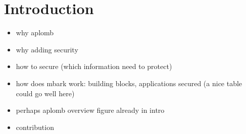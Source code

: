 
\section{Introduction}\label{sec:intro}
\begin{itemize}
\item why aplomb
\item why adding security
\item how to secure (which information need to protect)
\item how does mbark work: building blocks, applications secured (a nice table could go well here)
\item perhaps aplomb overview figure already in intro
\item contribution
\end{itemize}
